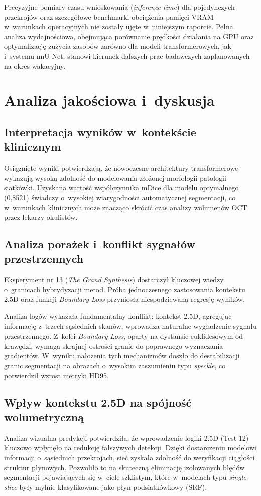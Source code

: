 \documentclass[12pt,a4paper,oneside]{report}
\begin{document}
Precyzyjne pomiary czasu wnioskowania (\textit{inference time}) dla pojedynczych przekrojów oraz szczegółowe benchmarki obciążenia pamięci VRAM w~warunkach operacyjnych nie zostały ujęte w~niniejszym raporcie. Pełna analiza wydajnościowa, obejmująca porównanie prędkości działania na GPU oraz optymalizację zużycia zasobów zarówno dla modeli transformerowych, jak i~systemu nnU-Net, stanowi kierunek dalszych prac badawczych zaplanowanych na okres wakacyjny.

\chapter{Analiza jakościowa i~dyskusja}

\section{Interpretacja wyników w~kontekście klinicznym}
Osiągnięte wyniki potwierdzają, że nowoczesne architektury transformerowe wykazują wysoką zdolność do modelowania złożonej morfologii patologii siatkówki. Uzyskana wartość współczynnika mDice dla modelu optymalnego (0,8521) świadczy o~wysokiej wiarygodności automatycznej segmentacji, co w~warunkach klinicznych może znacząco skrócić czas analizy wolumenów OCT przez lekarzy okulistów.

\section{Analiza porażek i~konflikt sygnałów przestrzennych}

Eksperyment nr 13 (\textit{The Grand Synthesis}) dostarczył kluczowej wiedzy o~granicach hybrydyzacji metod. Próba jednoczesnego zastosowania kontekstu 2.5D oraz funkcji \textit{Boundary Loss} przyniosła niespodziewaną regresję wyników.

Analiza logów wykazała fundamentalny konflikt: kontekst 2.5D, agregując informację z~trzech sąsiednich skanów, wprowadza naturalne wygładzenie sygnału przestrzennego. Z~kolei \textit{Boundary Loss}, oparty na dystansie euklidesowym od krawędzi, wymaga skrajnej ostrości granic do poprawnego wyznaczania gradientów. W~wyniku nałożenia tych mechanizmów doszło do destabilizacji granic segmentacji na obrazach o~wysokim zaszumieniu typu \textit{speckle}, co potwierdził wzrost metryki HD95.

\section{Wpływ kontekstu 2.5D na spójność wolumetryczną}
Analiza wizualna predykcji potwierdziła, że wprowadzenie logiki 2.5D (Test 12) kluczowo wpłynęło na redukcję fałszywych detekcji. Dzięki dostarczeniu modelowi informacji o~sąsiednich przekrojach, sieć zyskała zdolność do weryfikacji ciągłości struktur płynowych. Pozwoliło to na skuteczną eliminację izolowanych błędów segmentacji pojawiających się w~ciele szklistym, które w~modelach typu \textit{single-slice} były mylnie klasyfikowane jako płyn podsiatkówkowy (SRF).
\end{document}
